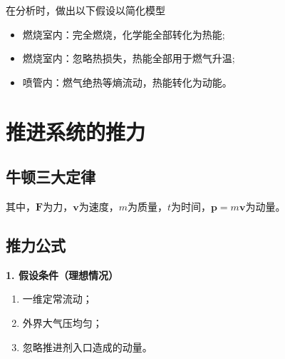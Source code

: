 \noindent 在分析时，做出以下假设以简化模型\vspace*{-0.5em}
\begin{itemize}
	\item 燃烧室内：完全燃烧，化学能全部转化为热能;\vspace*{-0.5em}
	\item 燃烧室内：忽略热损失，热能全部用于燃气升温;\vspace*{-0.5em}
	\item 喷管内：燃气绝热等熵流动，热能转化为动能。
\end{itemize}
\vspace*{-0.5em}

\section{推进系统的推力}
\subsection{牛顿三大定律}
\vspace*{-1em}

其中，$\bm{F}$为力，$\bm{v}$为速度，$m$为质量，$t$为时间，$\bm{p} = m \bm{v}$为动量。
\vspace*{1em}

\subsection{推力公式}
\noindent \textbf{1. 假设条件（理想情况）}\vspace*{-0.5em}
\begin{enumerate}[\hspace*{1.5em} (1) ]
	\item 一维定常流动；\vspace*{-0.5em}
	\item 外界大气压均匀；\vspace*{-0.5em}
	\item 忽略推进剂入口造成的动量。
\end{enumerate}
\vspace*{1em}

